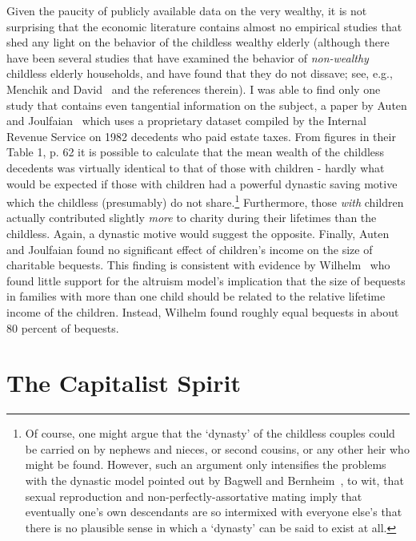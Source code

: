 \documentclass[titlepage,12pt]{article}
\begin{document}
Given the paucity of publicly available data on the very wealthy, it 
is not surprising that the economic literature contains almost no 
empirical studies that shed any light on the behavior of the childless 
wealthy elderly (although there have been several studies that have 
examined the behavior of {\it non-wealthy} childless elderly 
households, and have found that they do not dissave; see, e.g., 
Menchik and David~\citeyear{menchik&david:nodissav} and the references 
therein).  I was able to find only one study that contains even 
tangential information on the subject, a paper by Auten and 
Joulfaian~\citeyear{auten&joulfaian:charitable} which uses a proprietary 
dataset compiled by the Internal Revenue Service on 1982 decedents who 
paid estate taxes.  From figures in their Table 1, p.  62 it is 
possible to calculate that the mean wealth of the childless decedents 
was virtually identical to that of those with children - hardly what 
would be expected if those with children had a powerful dynastic 
saving motive which the childless (presumably) do not 
share.\footnote{Of course, one might argue that the `dynasty' of the 
childless couples could be carried on by nephews and nieces, or second 
cousins, or any other heir who might be found.  However, such an 
argument only intensifies the problems with the dynastic model pointed 
out by Bagwell and Bernheim~\citeyear{bagwell&bernheim:sex}, to wit, that 
sexual reproduction and non-perfectly-assortative mating imply that 
eventually one's own descendants are so intermixed with everyone 
else's that there is no plausible sense in which a `dynasty' can be 
said to exist at all.} Furthermore, those {\it with} children actually 
contributed slightly {\it more} to charity during their lifetimes than 
the childless.  Again, a dynastic motive would suggest the opposite.  
Finally, Auten and Joulfaian found no significant effect of children's 
income on the size of charitable bequests.  This finding is consistent 
with evidence by Wilhelm~\citeyear{wilhelm:bequest} who found little 
support for the altruism model's implication that the size of bequests 
in families with more than one child should be related to the relative 
lifetime income of the children.  Instead, Wilhelm found roughly equal 
bequests in about 80 percent of bequests.

\hypertarget{the-capitalist-spirit}{}
\section{The Capitalist Spirit}
\label{sec:CapitalistModel}
\end{document}
